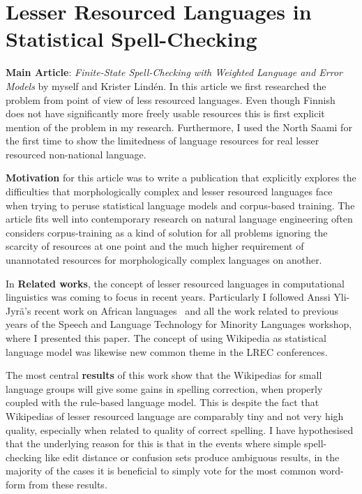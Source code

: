 \documentclass[officiallayout]{unihelcompling}
\begin{document}
\section{Lesser Resourced Languages in Statistical Spell-Checking}
\label{sec:lesser-training}

\textbf{Main Article}: \emph{Finite-State Spell-Checking with Weighted Language
and Error Models} by myself and Krister Lindén. In this article we first
researched the problem from point of view of less resourced languages. Even
though Finnish does not have significantly more freely usable resources this
is first explicit mention of the problem in my research. Furthermore, I
used the North Saami for the first time to show the limitedness of language
resources for real lesser resourced non-national language.

\textbf{Motivation} for this article was to write a publication that explicitly
explores the difficulties that morphologically complex and lesser resourced
languages face when trying to peruse statistical language models and
corpus-based training. The article fits well into contemporary research on
natural language engineering often considers corpus-training as a kind of
solution for all problems ignoring the scarcity of resources at one point and
the much higher requirement of unannotated resources for morphologically
complex languages on another.

In \textbf{Related works}, the concept of lesser resourced languages in
computational linguistics was coming to focus in recent years. Particularly I
followed Anssi Yli-Jyrä's recent work on African
languages~\citep{yli2005toward} and all the work related to previous years of
the Speech and Language Technology for Minority Languages workshop, where I
presented this paper.  The concept of using Wikipedia as statistical language
model was likewise new common theme in the LREC conferences.

The most central \textbf{results} of this work show that the Wikipedias for
small language groups will give some gains in spelling correction, when
properly coupled with the rule-based language model. This is despite the fact
that Wikipedias of lesser resourced language are comparably tiny and not very
high quality, especially when related to quality of correct spelling.  I have
hypothesised that the underlying reason for this is that in the events where
simple spell-checking like edit distance or confusion sets produce ambiguous
results, in the majority of the cases it is beneficial to simply vote for the
most common word-form from these results.
\end{document}
